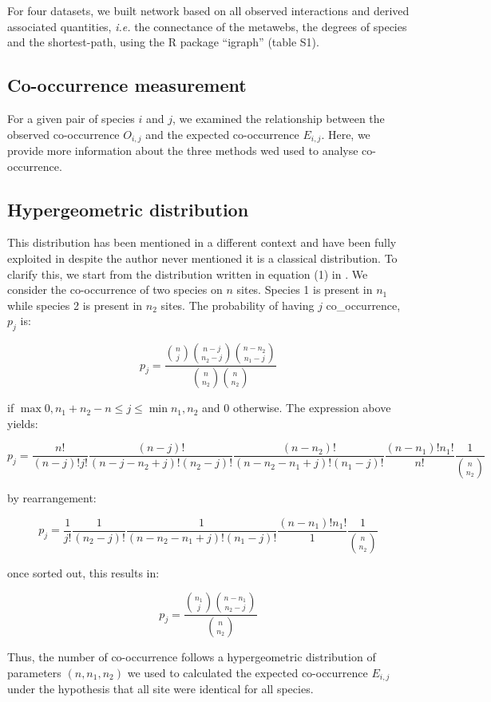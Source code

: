 For four datasets, we built network based on all observed interactions
and derived associated quantities, \emph{i.e.} the connectance of the
metawebs, the degrees of species and the shortest-path, using the R
package ``igraph'' (table S1).

\subsection{Co-occurrence measurement}\label{co-occurrence-measurement}

For a given pair of species \(i\) and \(j\), we examined the
relationship between the observed co-occurrence \(O_{i,j}\) and the
expected co-occurrence \(E_{i,j}\). Here, we provide more information
about the three methods wed used to analyse co-occurrence.

\subsection{Hypergeometric
distribution}\label{hypergeometric-distribution}

This distribution has been mentioned in a different context
\citep[see][]{Gilpin1982} and have been fully exploited in
\citet{Veech_2013} despite the author never mentioned it is a classical
distribution. To clarify this, we start from the distribution written in
equation (1) in \citet{Veech2013}. We consider the co-occurrence of two
species on \(n\) sites. Species 1 is present in \(n_1\) while species 2
is present in \(n_2\) sites. The probability of having \(j\)
co\_occurrence, \(p_j\) is:

\[ p_j= \frac{\binom{n}{j} \binom{n-j}{n_2-j} \binom{n-n_2}{n_1-j}}{\binom{n}{n_2} \binom{n}{n_2}} \]

if \(\max{0, n_1+n_2-n} \leq j \leq \min{n_1, n_2}\) and 0 otherwise.
The expression above yields:

\[ p_j= \frac{n!}{(n-j)!j!} \frac{(n-j)!}{(n-j-n_2+j)!(n_2-j)!} \frac{(n-n_2)!}{(n-n_2-n_1+j)!(n_1-j)!} \frac{(n-n_1)!n_1!}{n!} \frac{1}{\binom{n}{n_2}} \]

by rearrangement:

\[ p_j= \frac{1}{j!} \frac{1}{(n_2-j)!} \frac{1}{(n-n_2-n_1+j)!(n_1-j)!} \frac{(n-n_1)!n_1!}{1} \frac{1}{\binom{n}{n_2}} \]

once sorted out, this results in:

\[ p_j= \frac{\binom{n_1}{j} \binom{n-n_1}{n_2-j}}{\binom{n}{n_2}} \]

Thus, the number of co-occurrence follows a hypergeometric distribution
of parameters \((n,n_1,n_2)\) we used to calculated the expected
co-occurrence \(E_{i,j}\) under the hypothesis that all site were
identical for all species.

